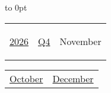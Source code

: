 \vbox to 0pt{}


\pagebreak
{\noindent\Large\renewcommand{\arraystretch}{\myNumArrayStretch}\begin{tabular}{|l|l|l}
\hyperlink{2026}{2026} & \hyperlink{Q4}{Q4} & \hypertarget{November}{November}
\end{tabular}\hfill%
\begin{tabular}{r|r@{}}
\hyperlink{October}{October} & \hyperlink{December}{December}
\end{tabular}}
\myLineThick\medskip

{%

\setlength{\tabcolsep}{\myLenTabColSep}%
%
\begin{tabularx}{\linewidth}{|l!{\vrule width \myLenLineThicknessThick}*{7}{@{}X@{}|}}
  

\end{tabularx}}
